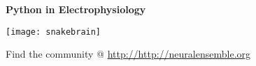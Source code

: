 




\begin{multicols}{3}    %

\begin{center}\Large \textbf{Python in Electrophysiology}\end{center}

\begin{center}
\noindent
\texttt{[image: snakebrain]}

Find the community @ \url{http://http://neuralensemble.org}


\end{center}
\vspace{0em}








\end{multicols}
